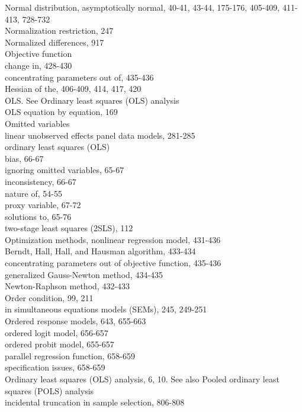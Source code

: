 \documentclass[10pt]{article}
\begin{document}
Normal distribution, asymptotically normal, 40-41, 43-44, 175-176, 405-409, 411-413, 728-732\\
Normalization restriction, 247\\
Normalized differences, 917\\
Objective function\\
change in, 428-430\\
concentrating parameters out of, 435-436\\
Hessian of the, 406-409, 414, 417, 420\\
OLS. See Ordinary least squares (OLS) analysis\\
OLS equation by equation, 169\\
Omitted variables\\
linear unobserved effects panel data models, 281-285\\
ordinary least squares (OLS)\\
bias, 66-67\\
ignoring omitted variables, 65-67\\
inconsistency, 66-67\\
nature of, 54-55\\
proxy variable, 67-72\\
solutions to, 65-76\\
two-stage least squares (2SLS), 112\\
Optimization methods, nonlinear regression model, 431-436\\
Berndt, Hall, Hall, and Hausman algorithm, 433-434\\
concentrating parameters out of objective function, 435-436\\
generalized Gauss-Newton method, 434-435\\
Newton-Raphson method, 432-433\\
Order condition, 99, 211\\
in simultaneous equations models (SEMs), 245, 249-251\\
Ordered response models, 643, 655-663\\
ordered logit model, 656-657\\
ordered probit model, 655-657\\
parallel regression function, 658-659\\
specification issues, 658-659\\
Ordinary least squares (OLS) analysis, 6, 10. See also Pooled ordinary least squares (POLS) analysis\\
incidental truncation in sample selection, 806-808\\
\end{document}
